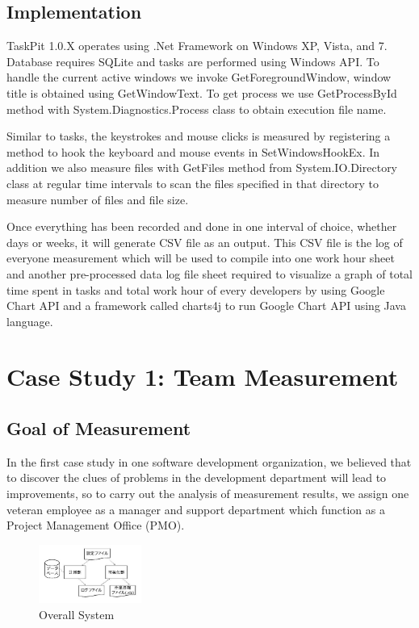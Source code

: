 \documentclass [paper]{ieice}
\begin{document}
\subsection{Implementation}
	TaskPit 1.0.X operates using .Net Framework on  Windows XP, Vista, and 7. Database requires SQLite and tasks are performed using Windows API. To handle the current active windows we invoke GetForegroundWindow, window title is obtained using GetWindowText. To get process we use GetProcessById method with System.Diagnostics.Process class to obtain execution file name. \par
	Similar to tasks, the keystrokes and mouse clicks is measured by registering a method to hook the keyboard and mouse events in SetWindowsHookEx. In addition we also measure files with GetFiles method from System.IO.Directory class at regular time intervals to scan the files specified in that directory to measure number of files and file size. \par
	Once everything has been recorded and done in one interval of choice, whether days or weeks, it will generate CSV file as an output. This CSV file is the log of everyone measurement which will be used to compile into one work hour sheet and another pre-processed data log file sheet required to visualize a graph of total time spent in tasks and total work hour of every developers by using Google Chart API and a framework called charts4j to run Google Chart API using Java language.
	
\section{Case Study 1: Team Measurement}

\subsection{Goal of Measurement}
	In the first case study in one software development organization, we believed that to discover the clues of problems in the development department will lead to improvements, so to carry out the analysis of measurement results, we assign one veteran employee as a manager and support department which function as a Project Management Office (PMO).
	
\begin{figure}[h]
	\centering	
\includegraphics[width=0.3\textwidth]{fig4}
	\caption{Overall System}
	\label{fig4}
\end{figure}
\end{document}
